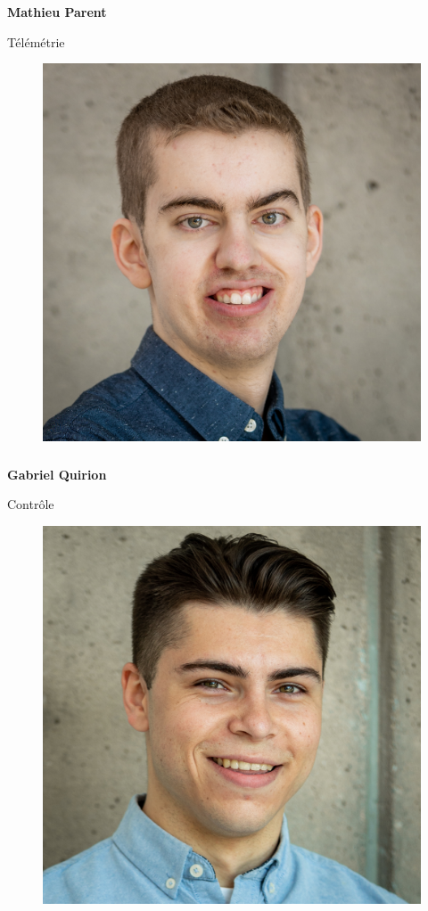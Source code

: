 \documentclass[a0paper,portrait]{baposter}
\begin{document}
\begin{poster}
{\subsubsection*{}
\vspace{2mm}
\textbf{Mathieu Parent}


Télémétrie
\begin{figure}
\includegraphics[width=.9\linewidth]{img/membres/Gabriel-Quirion-3.jpg} 
\end{figure}
\subsubsection*{}
\vspace{2mm}
\textbf{Gabriel Quirion}


Contrôle
\begin{figure}
\includegraphics[width=.9\linewidth]{img/membres/William-Rousseau-2.jpg} 
\end{figure}
}
\end{poster}
\end{document}

